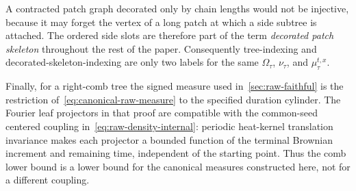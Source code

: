 A contracted patch graph decorated only by chain lengths would not be injective, because it may forget the vertex of a long patch at which a side subtree is attached. The ordered side slots are therefore part of the term \emph{decorated patch skeleton} throughout the rest of the paper. Consequently tree-indexing and decorated-skeleton-indexing are only two labels for the same $\Omega_\tau$, $\nu_\tau$, and $\mu_\tau^{t,x}$.

Finally, for a right-comb tree the signed measure used in~\cref{sec:raw-faithful} is the restriction of~\eqref{eq:canonical-raw-measure} to the specified duration cylinder. The Fourier leaf projectors in that proof are compatible with the common-seed centered coupling in~\eqref{eq:raw-density-internal}: periodic heat-kernel translation invariance makes each projector a bounded function of the terminal Brownian increment and remaining time, independent of the starting point. Thus the comb lower bound is a lower bound for the canonical measures constructed here, not for a different coupling.
